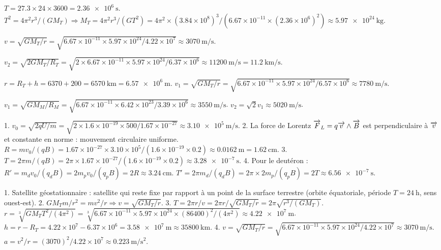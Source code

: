 $T = 27.3\times24\times3600 = \SI{2.36e6}{\second}$. $T^2 = 4\pi^2 r^3/(GM_T) \Rightarrow M_T = 4\pi^2 r^3/(GT^2) = 4\pi^2\times(3.84\times10^8)^3/(6.67\times10^{-11}\times(2.36\times10^6)^2) \approx \SI{5.97e24}{\kilogram}$.

$v = \sqrt{GM_T/r} = \sqrt{6.67\times10^{-11}\times5.97\times10^{24}/4.22\times10^7} \approx \SI{3070}{\metre\per\second}$.

$v_2 = \sqrt{2GM_T/R_T} = \sqrt{2\times6.67\times10^{-11}\times5.97\times10^{24}/6.37\times10^6} \approx \SI{11200}{\metre\per\second} = \SI{11.2}{\kilo\metre\per\second}$.

$r = R_T + h = 6370 + 200 = \SI{6570}{\kilo\metre} = \SI{6.57e6}{\metre}$. $v_1 = \sqrt{GM_T/r} = \sqrt{6.67\times10^{-11}\times5.97\times10^{24}/6.57\times10^6} \approx \SI{7780}{\metre\per\second}$.

$v_1 = \sqrt{GM_M/R_M} = \sqrt{6.67\times10^{-11}\times6.42\times10^{23}/3.39\times10^6} \approx \SI{3550}{\metre\per\second}$. $v_2 = \sqrt{2} v_1 \approx \SI{5020}{\metre\per\second}$.

1. $v_0 = \sqrt{2qU/m} = \sqrt{2\times1.6\times10^{-19}\times500/1.67\times10^{-27}} \approx \SI{3.10e5}{\metre\per\second}$.
2. La force de Lorentz $\overrightarrow{F}_L = q\overrightarrow{v}\wedge\overrightarrow{B}$ est perpendiculaire à $\overrightarrow{v}$ et constante en norme : mouvement circulaire uniforme. $R = mv_0/(qB) = 1.67\times10^{-27}\times3.10\times10^5/(1.6\times10^{-19}\times0.2) \approx \SI{0.0162}{\metre} = \SI{1.62}{\centi\metre}$.
3. $T = 2\pi m/(qB) = 2\pi\times1.67\times10^{-27}/(1.6\times10^{-19}\times0.2) \approx \SI{3.28e-7}{\second}$.
4. Pour le deutéron : $R' = m_d v_0/(q_d B) = 2m_p v_0/(q_p B) = 2R \approx \SI{3.24}{\centi\metre}$. $T' = 2\pi m_d/(q_d B) = 2\pi\times2m_p/(q_p B) = 2T \approx \SI{6.56e-7}{\second}$.

1. Satellite géostationnaire : satellite qui reste fixe par rapport à un point de la surface terrestre (orbite équatoriale, période $T=\SI{24}{\hour}$, sens ouest-est).
2. $GM_T m/r^2 = m v^2/r \Rightarrow v = \sqrt{GM_T/r}$.
3. $T = 2\pi r/v = 2\pi r/\sqrt{GM_T/r} = 2\pi\sqrt{r^3/(GM_T)}$. $r = \sqrt[3]{GM_T T^2/(4\pi^2)} = \sqrt[3]{6.67\times10^{-11}\times5.97\times10^{24}\times(86400)^2/(4\pi^2)} \approx \SI{4.22e7}{\metre}$. $h = r - R_T = 4.22\times10^7 - 6.37\times10^6 = \SI{3.58e7}{\metre} \approx \SI{35800}{\kilo\metre}$.
4. $v = \sqrt{GM_T/r} = \sqrt{6.67\times10^{-11}\times5.97\times10^{24}/4.22\times10^7} \approx \SI{3070}{\metre\per\second}$. $a = v^2/r = (3070)^2/4.22\times10^7 \approx \SI{0.223}{\metre\per\second\squared}$.